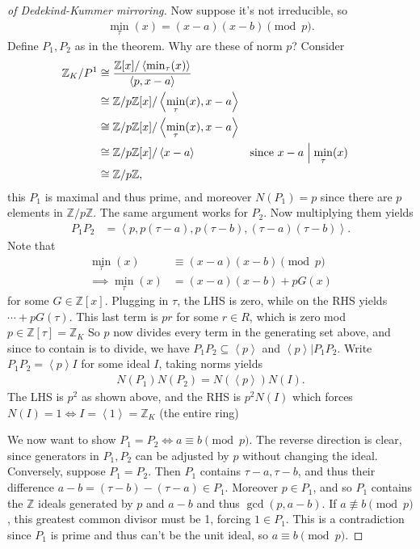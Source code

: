 \begin{proof}[of Dedekind-Kummer mirroring]
Now suppose it's not irreducible, so
\begin{align*}
\min_\tau(x) = (x-a)(x-b) \pmod p
.\end{align*}
Define \(P_1, P_2\) as in the theorem. Why are these of norm \(p\)?
Consider
\begin{align*}
{\mathbb{Z}}_K/P^1 
&\cong { {\mathbb{Z}}[x] / \left\langle{ \min_\tau(x) }\right\rangle \over \left\langle{ p, x-a }\right\rangle } \\
&\cong {\mathbb{Z}}/p{\mathbb{Z}}[x] / \left\langle{ \min_\tau(x), x-a}\right\rangle \\
&\cong {\mathbb{Z}}/p{\mathbb{Z}}[x] / \left\langle{ \min_\tau(x), x-a}\right\rangle \\
&\cong {\mathbb{Z}}/p{\mathbb{Z}}[x] / \left\langle{ x-a}\right\rangle && \text{since } x-a \mathrel{\Big|}\min_\tau(x)\\
&\cong {\mathbb{Z}}/p{\mathbb{Z}}
,\end{align*}
this \(P_1\) is maximal and thus prime, and moreover \(N(P_1) = p\)
since there are \(p\) elements in \({\mathbb{Z}}/p{\mathbb{Z}}\). The
same argument works for \(P_2\). Now multiplying them yields
\begin{align*}
P_1 P_2 
&= \left\langle{ p, p(\tau - a), p (\tau - b), (\tau -a)(\tau -b) }\right\rangle
.\end{align*}
Note that
\begin{align*}
\min_\tau(x) &\equiv (x-a)(x-b) \pmod p \\
\implies
\min_\tau(x) &= (x-a)(x-b) + pG(x)
\end{align*}
for some \(G\in {\mathbb{Z}}[x]\). Plugging in \(\tau\), the LHS is
zero, while on the RHS yields \(\cdots + pG(\tau)\). This last term is
\(pr\) for some \(r\in R\), which is zero mod
\(p \in {\mathbb{Z}}[\tau] = {\mathbb{Z}}_K\) So \(p\) now divides every
term in the generating set above, and since to contain is to divide, we
have \(P_1 P_2 \subseteq \left\langle{ p }\right\rangle\) and
\(\left\langle{ p }\right\rangle \mathrel{\Big|}P_1 P_2\). Write
\(P_1 P_2 = \left\langle{ p }\right\rangle I\) for some ideal \(I\),
taking norms yields
\begin{align*}
N(P_1) N(P_2) = N( \left\langle{ p }\right\rangle) N(I) 
.\end{align*}
The LHS is \(p^2\) as shown above, and the RHS is \(p^2 N(I)\) which
forces
\(N(I) = 1 \iff I = \left\langle{ 1 }\right\rangle = {\mathbb{Z}}_K\)
(the entire ring)

We now want to show \(P_1 = P_2 \iff a\equiv b \pmod p\). The reverse
direction is clear, since generators in \(P_1, P_2\) can be adjusted by
\(p\) without changing the ideal. Conversely, suppose \(P_1 = P_2\).
Then \(P_1\) contains \(\tau - a, \tau - b\), and thus their difference
\(a-b = (\tau -b ) - (\tau - a) \in P_1\). Moreover \(p\in P_1\), and so
\(P_1\) contains the \({\mathbb{Z}}\) ideals generated by \(p\) and
\(a-b\) and thus \(\gcd(p, a-b)\). If \(a \not\equiv b\pmod p\), this
greatest common divisor must be 1, forcing \(1\in P_1\). This is a
contradiction since \(P_1\) is prime and thus can't be the unit ideal,
so \(a \equiv b \pmod p\).

\end{proof}

